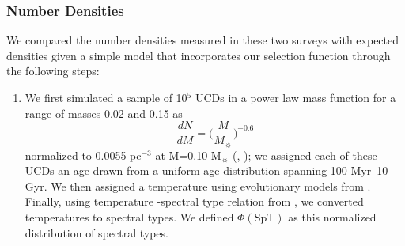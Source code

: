 \documentclass[manuscript]{aastex}
\begin{document}
\subsubsection{Number Densities}
We compared the number densities measured in these two surveys with expected densities given a simple model that incorporates our selection function through the following steps:
\begin{enumerate}
\item We first simulated a sample of 10$^5$ UCDs in a  power law mass function for a range of masses 0.02 \Msun and 0.15 \Msun  as \begin{equation}  \frac{dN}{dM} =\biggl( \frac{M}{M_\sun}\biggl)^{-0.6}\end{equation} normalized to 0.0055 pc$^{-3}$ at M=0.10 M$_\sun$ (\citealt{1999ApJ...521..613R}, \citealt{2001ApJ...554.1274C} ); we assigned each of these UCDs an age drawn from a uniform age distribution spanning 100 Myr--10 Gyr. We then assigned a temperature using evolutionary models from \cite{2003IAUS..211...41B}. Finally, using temperature -spectral type relation from \cite{Filippazzo2015}, we converted temperatures to spectral types. We defined $\Phi(\text{SpT})$ as this normalized distribution of spectral types.


\end{enumerate}
\end{document}
